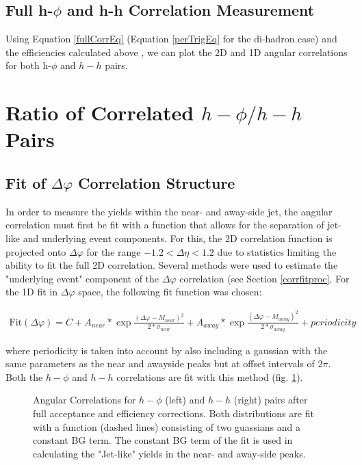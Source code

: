 \documentclass[ALICE,manyauthors]{ALICE_analysis_notes}
\begin{document}
\subsection{Full h-$\phi$ and h-h Correlation Measurement}

Using Equation \ref{fullCorrEq} (Equation \ref{perTrigEq} for the di-hadron case) and the efficiencies calculated above , we can plot the 2D and 1D angular correlations for both h-$\phi$ and $h-h$ pairs.

\section{Ratio of Correlated $h-\phi/h-h$ Pairs}

\subsection{Fit of $\Delta \varphi$ Correlation Structure}

In order to measure the yields within the near- and away-side jet, the angular correlation must first be fit with a function that allows for the separation of jet-like and underlying event components.  For this, the 2D correlation function is projected onto $\Delta\varphi$ for the range $-1.2 < \Delta\eta < 1.2$ due to statistics limiting the ability to fit the full 2D correlation. Several methods were used to estimate the "underlying event" component of the $\Delta\varphi$ correlation (see Section \ref{corrfitproc}. For the 1D fit in $\Delta\varphi$ space, the following fit function was chosen:

\begin{align}
	\text{Fit}(\Delta\varphi) = C + A_{near}*\exp{\frac{(\Delta\varphi - M_{near})^2}{2*\sigma_{near}}} + A_{away}*\exp{\frac{(\Delta\varphi - M_{away})^2}{2*\sigma_{away}}} + \textit{periodicity}
\end{align}

where periodicity is taken into account by also including a gaussian with the same parameters as the near and awayside peaks but at offset intervals of $2\pi$. Both the $h-\phi$ and $h-h$ correlations are fit with this method (fig. \ref{dphi}).
\begin{figure}[ht]
\begin{subfigure}{
\texttt{[image: images/dphi\_hPhi\_0\_20.pdf]}}
\end{subfigure}
\begin{subfigure}{
\texttt{[image: images/dphi\_hh\_0\_20.pdf]}}
\end{subfigure}
\caption{Angular Correlations for $h-\phi$ (left) and $h-h$ (right) pairs after full acceptance and efficiency corrections.  Both distributions are fit with a function (dashed lines) consisting of two guassians and a constant BG term. The constant BG term of the fit is used in calculating the "Jet-like" yields in the near- and away-side peaks.}
\label{dphi}
\end{figure}
\end{document}
